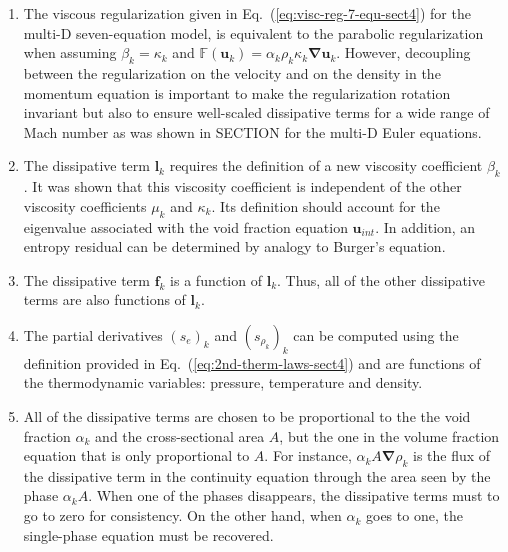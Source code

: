 \documentclass[preprint,10pt]{elsarticle}
\newcommand{\grad}{\mbold{\nabla}}
\newcommand{\mbold}[1]{\boldsymbol#1}
\newcommand{\eqt}[1]{Eq.~(\ref{#1})}                     %
\newcommand{\tcr}[1]{\textcolor{red}{#1}}
\begin{document}
\begin{enumerate}
\item {The viscous regularization given in \eqt{eq:visc-reg-7-equ-sect4} for the multi-D seven-equation model, is equivalent to the parabolic regularization \cite{Parabolic} when assuming $\beta_k = \kappa_k$ and $\mathbb{F}(\mbold u_k) = \alpha_k \rho_k \kappa_k \grad \mbold u_k$. However, decoupling between the regularization on the velocity and on the density in the momentum equation is important to make the regularization rotation invariant but also to ensure well-scaled dissipative terms for a wide range of Mach number as was shown in SECTION for the multi-D Euler equations.}
\item {The dissipative term $\mbold l_k$ requires the definition of a new viscosity
    coefficient $\beta_k$. It was shown that this viscosity coefficient is independent of
    the other viscosity coefficients $\mu_k$ and $\kappa_k$. Its definition should
    account for the eigenvalue associated with the void fraction equation $\mbold u_{int}$.
    In addition, an entropy residual can be determined by analogy to Burger's
    equation. }

\item {The dissipative term $\mbold f_k$ is a function of $\mbold l_k$. Thus, all of the other
    dissipative terms are also functions of $\mbold l_k$.}

\item {The partial derivatives $(s_e)_k$ and $(s_{\rho_k})_k$ can be computed using the
    definition provided in \eqt{eq:2nd-therm-laws-sect4} and are functions of the thermodynamic
    variables: pressure, temperature and density.}

\item {All of the dissipative terms are chosen to be proportional to the the void
    fraction $\alpha_k$ and the cross-sectional area $A$, but the one in the volume fraction equation that is only proportional to $A$. For instance, $\alpha_k A \grad \rho_k$ is the
    flux of the dissipative term in the continuity equation through the area seen
    by the phase $\alpha_k A$. When one of the phases disappears, the dissipative terms
    must to go to zero for consistency. On the other hand, when $\alpha_k$ goes to one,
    the single-phase equation must be recovered. }
    

\end{enumerate}
\end{document}
